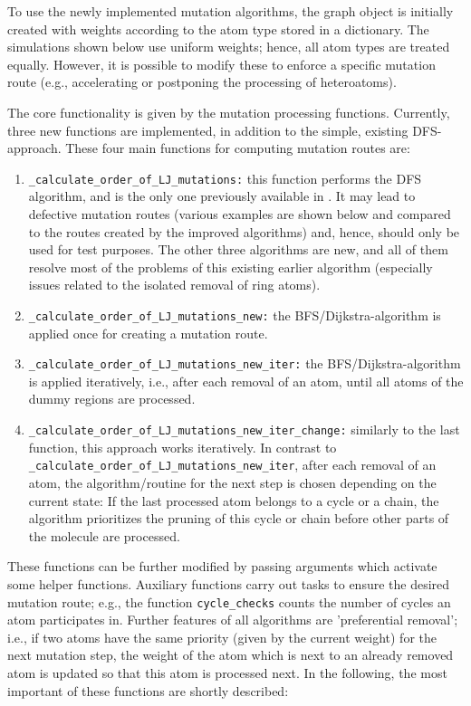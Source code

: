 To use the newly implemented mutation algorithms, the graph object
is initially created with weights according to the atom type stored in a dictionary. The simulations shown
below use uniform weights; hence, all atom types are treated equally. However, it is possible to modify these to
enforce a specific mutation route (e.g., accelerating or postponing
the processing of heteroatoms). 

The core functionality is given by the mutation processing functions.
Currently, three new functions are implemented, in addition to
the simple, existing DFS-approach.
These four main functions for computing mutation routes are:

\begin{enumerate}
\item \texttt{\_calculate\_order\_of\_LJ\_mutations:} this function performs the DFS algorithm, and is the only one previously available in {\trafo}. It may lead to  defective mutation routes (various examples are shown below and compared to the routes created by the improved algorithms) and, hence,
should only be used for test purposes. The other three algorithms
are new, and all of them resolve most of the problems of this existing earlier
algorithm (especially issues related to the isolated removal of ring atoms).


\item \texttt{\_calculate\_order\_of\_LJ\_mutations\_new:} the BFS/Dijkstra-algorithm is
applied once for creating a mutation route.

\item \texttt{\_calculate\_order\_of\_LJ\_mutations\_new\_iter:} the BFS/Dijkstra-algorithm is
applied iteratively, i.e., after each removal of an atom, until all atoms of the dummy regions are processed.

\item \texttt{\_calculate\_order\_of\_LJ\_mutations\_new\_iter\_change:}
similarly to the last function, this approach works iteratively. In contrast to \texttt{\_calculate\_order\_of\_LJ\_mutations\_new\_iter}, after each removal of an atom, the algorithm/routine for the next step is chosen depending on the current state: If the last processed atom belongs to a cycle or a chain, the algorithm prioritizes the pruning of this cycle or chain before other parts of the molecule are processed.
\end{enumerate}

These functions
can be further modified by passing arguments which activate some helper
functions.  Auxiliary functions carry out tasks to ensure the
desired mutation route; e.g., the function \texttt{cycle\_checks} counts the number of cycles an atom participates
in. Further features of all algorithms are 'preferential removal';
i.e., if two atoms have the same priority (given by the current
weight) for the next mutation step, the weight of the atom which is
next to an already removed atom is updated so that this atom is processed
next. 
In the following, the most important of these functions are shortly described:


